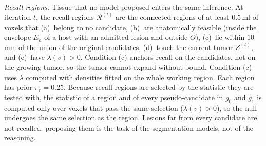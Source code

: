 \documentclass[fleqn,10pt]{olplainarticle}
\begin{document}
\textit{Recall regions.} Tissue that no model proposed enters the same inference. At iteration $t$, the recall regions
$\mathcal{R}^{(t)}$ are the connected regions of at least $0.5$\,ml of voxels that (a)~belong to no candidate, (b)~are
anatomically feasible (inside the envelope $E_h$ of a host with an admitted lesion and outside $\bar O$), (c)~lie within
$10$\,mm of the union of the original candidates, (d)~touch the current tumor $Z^{(t)}$, and (e)~have $\lambda(v)>0$.
Condition (c) anchors recall on the candidates, not on the growing tumor, so the tumor cannot expand without bound.
Condition (e) uses $\lambda$ computed with densities fitted on the whole working region. Each region has prior
$\pi_r=0.25$. Because recall regions are selected by the statistic they are tested with, the statistic of a region and of
every pseudo-candidate in $g_0$ and $g_1$ is computed only over voxels that pass the same selection ($\lambda(v)>0$), so the
null undergoes the same selection as the region. Lesions far from every candidate are not recalled: proposing them is the task of the segmentation models, not of
the reasoning.
\end{document}
